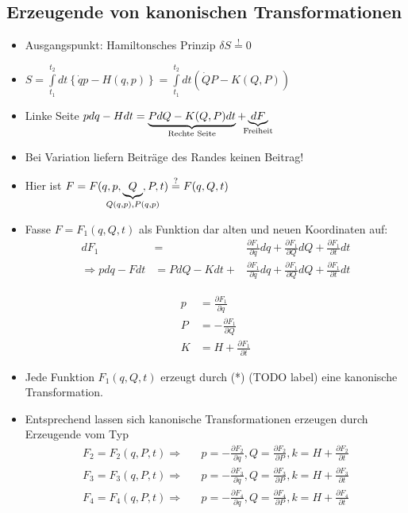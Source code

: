 \subsection{Erzeugende von kanonischen Transformationen}
\begin{itemize}
\item Ausgangspunkt: Hamiltonsches Prinzip
  $\delta S \stackrel{!}{=} 0$
\item
  $S = \int\limits_{t_1}^{t_2} dt \left\{ \dot{q} p - H(q,p) \right\}
  = \int\limits_{t_1}^{t_2}dt \left( \dot{Q}P - K(Q,P) \right) $
\item Linke Seite
  $pdq - Hdt = \underbrace{PdQ - K(Q,P) dt}_{\mathclap{\text{Rechte Seite}}} +
  \underbrace{dF}_{\mathclap{\text{Freiheit}}}$
\item Bei Variation liefern Beiträge des Randes keinen Beitrag!
\item Hier ist
  $F = F ( q,p,\underbrace{Q}_{\mathclap{Q(q,p),P(q,p)}},P,t )
  \stackrel{?}{=} F(q,Q,t)$
\item Fasse $F = F_1(q,Q,t)$ als Funktion dar alten und neuen
  Koordinaten auf:
  \begin{align*}
\label{eq:2}
dF_1 &= &\frac{\partial F_1}{\partial q}dq + \frac{ \partial F_1}{\partial Q}dQ + \frac{\partial F_1}{\partial t} dt\\
\Rightarrow pdq - Fdt &= PdQ - Kdt + &\frac{\partial F_1}{\partial q}dq + \frac{ \partial F_1}{\partial Q}dQ + \frac{\partial F_1}{\partial t} dt
\end{align*}

\begin{align*}
p &= \frac{\partial F_1}{\partial q}\\
P &= - \frac{\partial F_1}{\partial Q}\\
K &= H + \frac{\partial F_1}{\partial t}
\end{align*}
\item Jede Funktion $F_1(q,Q,t)$ erzeugt durch (*) (TODO label) eine
  kanonische Transformation.
\item Entsprechend lassen sich kanonische Transformationen erzeugen
  durch Erzeugende vom Typ
  \begin{align*}
F_2 = F_2(q,P,t) \Rightarrow &&p = -\frac{\partial F_2}{\partial q}, Q = \frac{\partial F_2}{\partial P}, k = H + \frac{\partial F_2}{\partial t}\\
F_3 = F_3(q,P,t) \Rightarrow &&p = -\frac{\partial F_3}{\partial q}, Q = \frac{\partial F_3}{\partial P}, k = H + \frac{\partial F_3}{\partial t}\\
F_4 = F_4(q,P,t) \Rightarrow &&p = -\frac{\partial F_4}{\partial q}, Q = \frac{\partial F_4}{\partial P}, k = H + \frac{\partial F_4}{\partial t}
\end{align*}

\end{itemize}

